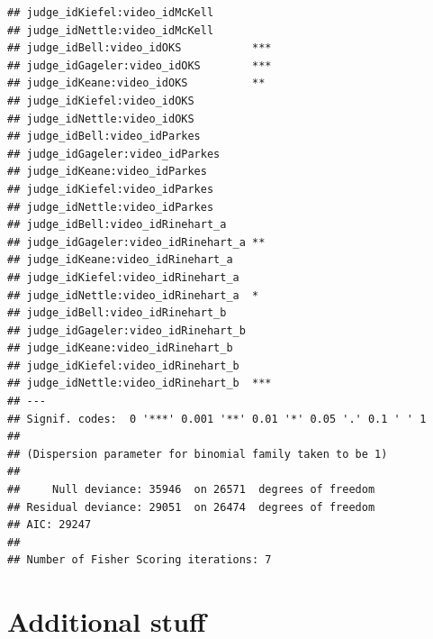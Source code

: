 \documentclass{monashthesis}
\begin{document}
\begin{verbatim}
## judge_idKiefel:video_idMcKell         
## judge_idNettle:video_idMcKell         
## judge_idBell:video_idOKS           ***
## judge_idGageler:video_idOKS        ***
## judge_idKeane:video_idOKS          ** 
## judge_idKiefel:video_idOKS            
## judge_idNettle:video_idOKS            
## judge_idBell:video_idParkes           
## judge_idGageler:video_idParkes        
## judge_idKeane:video_idParkes          
## judge_idKiefel:video_idParkes         
## judge_idNettle:video_idParkes         
## judge_idBell:video_idRinehart_a       
## judge_idGageler:video_idRinehart_a ** 
## judge_idKeane:video_idRinehart_a      
## judge_idKiefel:video_idRinehart_a     
## judge_idNettle:video_idRinehart_a  *  
## judge_idBell:video_idRinehart_b       
## judge_idGageler:video_idRinehart_b    
## judge_idKeane:video_idRinehart_b      
## judge_idKiefel:video_idRinehart_b     
## judge_idNettle:video_idRinehart_b  ***
## ---
## Signif. codes:  0 '***' 0.001 '**' 0.01 '*' 0.05 '.' 0.1 ' ' 1
## 
## (Dispersion parameter for binomial family taken to be 1)
## 
##     Null deviance: 35946  on 26571  degrees of freedom
## Residual deviance: 29051  on 26474  degrees of freedom
## AIC: 29247
## 
## Number of Fisher Scoring iterations: 7
\end{verbatim}

\appendix

\hypertarget{additional-stuff}{%
\chapter{Additional stuff}\label{additional-stuff}}
\end{document}
